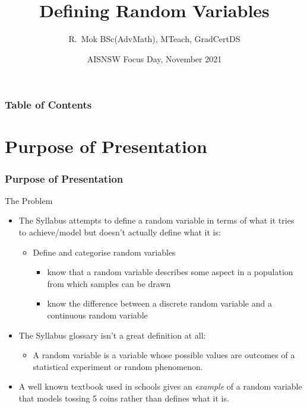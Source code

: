 \documentclass{beamer}
\title[Defining Random Variables] %
{Defining Random Variables}
\author[R. Mok] %
{R.~Mok BSc(AdvMath), MTeach, GradCertDS}
\date[November 2021] %
{AISNSW Focus Day, November 2021}
\begin{document}
\frame{\titlepage}


\begin{frame}
\frametitle{Table of Contents}
\tableofcontents
\end{frame}

\section{Purpose of Presentation}


\begin{frame}
\frametitle{Purpose of Presentation}
\begin{block}{The Problem}
\begin{itemize}
  \item<2-> The Syllabus attempts to define a random variable in terms of what it tries to achieve/model but doesn't actually define what it is:
    \begin{itemize}
      \item Define and categorise random variables
        \begin{itemize}
          \item know that a random variable describes some aspect in a population from which samples can be drawn
          \item know the difference between a discrete random variable and a continuous random variable
        \end{itemize}
    \end{itemize}
    \parencite[p.~47]{syllabus}
  \item<3-> The Syllabus glossary isn't a great definition at all:
    \begin{itemize}
      \item A random variable is a variable whose possible values are outcomes of a statistical experiment or random phenomenon.
        \parencite[p.~73]{syllabus}
    \end{itemize}
  \item<5-> A well known textbook used in schools gives an \emph{example} of a random variable that models tossing 5 coins rather than defines what it is.
\end{itemize}
\end{block}
\end{frame}
\end{document}
